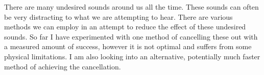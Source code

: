 \thispagestyle{plain}
There are many undesired sounds around us all the time.
These sounds can often be very distracting to what we are attempting to hear.
There are various methods we can employ in an attempt to reduce the effect of these undesired sounds.
So far I have experimented with one method of cancelling these out with a measured amount of success, however it is not optimal and suffers from some physical limitations.
I am also looking into an alternative, potentially much faster method of achieving the cancellation.
